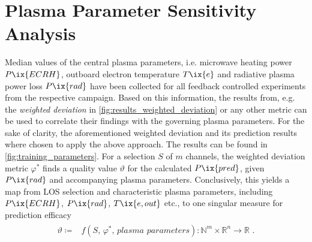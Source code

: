     \section{Plasma Parameter Sensitivity Analysis}\label{sec:senseresults}%
%
        Median values of the central plasma parameters, i.e. microwave heating power $P\ix{ECRH}$, outboard electron temperature $T\ix{e}$ and radiative plasma power loss $P\ix{rad}$ have been collected for all feedback controlled experiments from the respective campaign. Based on this information, the results from, e.g. the \textit{weighted deviation} in \cref{fig:results_weighted_deviation} or any other metric can be used to correlate their findings with the governing plasma parameters. For the sake of clarity, the aforementioned weighted deviation and its prediction results where chosen to apply the above approach. The results can be found in \cref{fig:training_parameters}. For a selection $S$ of $m$ channels, the weighted deviation metric $\varphi^{\ast}$ finds a quality value $\vartheta$ for the calculated $P\ix{pred}$, given $P\ix{rad}$ and accompanying plasma parameters. Conclusively, this yields a map from LOS selection and characteristic plasma parameters, including $P\ix{ECRH}$, $P\ix{rad}$, $T\ix{e,out}$ etc., to one singular measure for prediction efficacy%
%
        \begin{align}%
            \begin{split}\label{eq:sensitivity_parameter_map}%
                \vartheta\coloneqq &f\left(S,\,\varphi^{\ast},\,\textit{plasma parameters}\right)\colon\mathbb{N}^{m}\times\mathbb{R}^{n}\to\mathbb{R}\,\,.%
            \end{split}%
        \end{align}%
%
